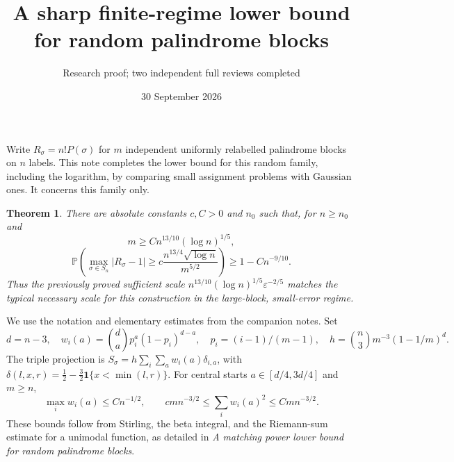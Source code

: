 \documentclass[11pt]{article}
\title{A sharp finite-regime lower bound for random palindrome blocks}
\author{Research proof; two independent full reviews completed}
\date{30 September 2026}
\newtheorem{theorem}{Theorem}
\newcommand{\Prob}{\mathbb P}
\begin{document}
\maketitle

Write $R_\sigma=n!P(\sigma)$ for $m$ independent uniformly relabelled
palindrome blocks on $n$ labels. This note completes the lower bound for
this random family, including the logarithm, by comparing small assignment
problems with Gaussian ones. It concerns this family only.

\begin{theorem}\label{thm:main}
There are absolute constants $c,C>0$ and $n_0$ such that, for $n\geq n_0$
and
\[
 m\geq Cn^{13/10}(\log n)^{1/5},
\]
\[
 \Prob\left(\max_{\sigma\in S_n}|R_\sigma-1|
       \geq c\frac{n^{13/4}\sqrt{\log n}}{m^{5/2}}\right)
 \geq1-Cn^{-9/10}.
\]
Thus the previously proved sufficient scale
$n^{13/10}(\log n)^{1/5}\varepsilon^{-2/5}$ matches the typical necessary
scale for this construction in the large-block, small-error regime.
\end{theorem}

We use the notation and elementary estimates from the companion notes.
Set
\[
 d=n-3,\quad w_i(a)=\binom da p_i^a(1-p_i)^{d-a},\quad
 p_i=(i-1)/(m-1),\quad
 h=\binom n3m^{-3}(1-1/m)^d.
\]
The triple projection is
$S_\sigma=h\sum_i\sum_aw_i(a)\delta_{i,a}$, with
$\delta(l,x,r)=\tfrac12-\tfrac32\mathbf1\{x<\min(l,r)\}$.
For central starts $a\in[d/4,3d/4]$ and $m\geq n$,
\begin{equation}\label{eq:weights}
 \max_iw_i(a)\leq Cn^{-1/2},\qquad
 c m n^{-3/2}\leq\sum_iw_i(a)^2\leq C m n^{-3/2}.
\end{equation}
These bounds follow from Stirling, the beta integral, and the Riemann-sum
estimate for a unimodal function, as detailed in
\emph{A matching power lower bound for random palindrome blocks}.
\end{document}
